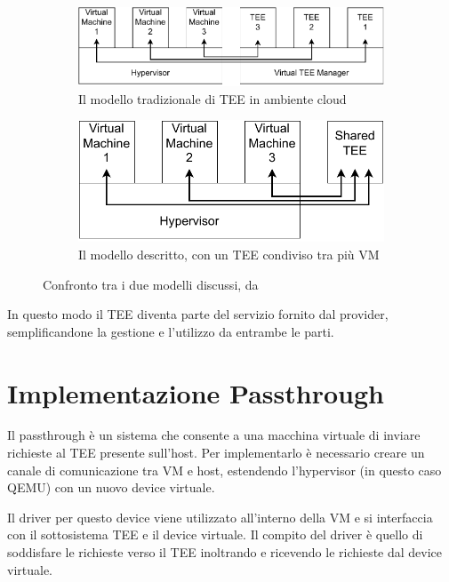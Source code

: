 \documentclass[12pt,italian]{report}
\begin{document}
	\bigbreak
	
	\begin{figure}[h]
		\centering
		\begin{subfigure}{\columnwidth}
			\centering
			\includegraphics[width=0.8\linewidth]{immagini/common-cloud-tee-model}
			\caption{Il modello tradizionale di TEE in ambiente cloud}
			\label{fig:common-cloud-tee-model}
		\end{subfigure}
		
		\begin{subfigure}{\columnwidth}
			\centering
			\includegraphics[width=0.53\linewidth]{immagini/our-cloud-tee-model}
			\caption{Il modello descritto, con un TEE condiviso tra più VM}
			\label{fig:our-cloud-tee-model}
		\end{subfigure}
		\caption{Confronto tra i due modelli discussi, da \cite{tesi_cutecchia}}
	\end{figure}
	
	In questo modo il TEE diventa parte del servizio fornito dal provider, semplificandone la gestione e l'utilizzo da entrambe le parti.
	
	\section{Implementazione Passthrough}
	\label{sec:pass_impl}
	Il passthrough è un sistema che consente a una macchina virtuale di inviare richieste al TEE presente sull'host. Per implementarlo è necessario creare un canale di comunicazione tra VM e host, estendendo l'hypervisor (in questo caso QEMU) con un nuovo device virtuale.
	
	Il driver per questo device viene utilizzato all'interno della VM e si interfaccia con il sottosistema TEE e il device virtuale. Il compito del driver è quello di soddisfare le richieste verso il TEE inoltrando e ricevendo le richieste dal device virtuale.
	
\end{document}
